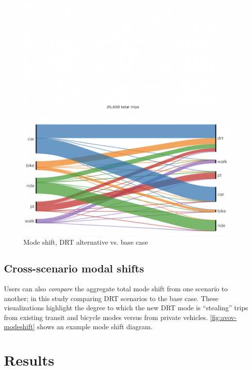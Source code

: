 \begin{figure}[ht]
\begin{minipage}[c]{0.45\textwidth}
     \includegraphics[width=\linewidth]{chapters/22-avov/images/fig-mode-share.png}
     \caption{Mode shift, DRT alternative vs. base case}
     \label{fig:avov-modeshift}
  \end{minipage}
\end{figure}

\subsection{Cross-scenario modal shifts}
\label{avov-mode-shifts}

Users can also \emph{compare} the aggregate total mode shift from one scenario to another; in this study comparing DRT scenarios to the base case. These visualizations highlight the degree to which the new DRT mode is ``stealing'' trips from existing transit and bicycle modes versus from private vehicles. \autoref{fig:avov-modeshift} shows an example mode shift diagram.

\section{Results}
\label{avov-results}

